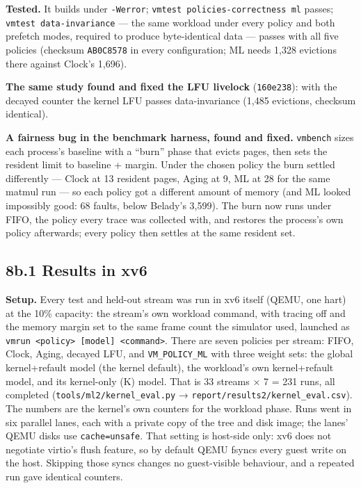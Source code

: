 \documentclass[10pt,a4paper]{article}
\newcommand{\code}[1]{\texttt{#1}}
\begin{document}
\textbf{Tested.} It builds under \code{-Werror}; \code{vmtest policies-correctness ml} passes; \code{vmtest data-invariance} — the same workload under every policy and both prefetch modes, required to produce byte-identical data — passes with all five policies (checksum \code{AB0C8578} in every configuration; ML needs 1,328 evictions there against Clock's 1,696).

\textbf{The same study found and fixed the LFU livelock} (\code{160e238}): with the decayed counter the kernel LFU passes data-invariance (1,485 evictions, checksum identical).

\textbf{A fairness bug in the benchmark harness, found and fixed.} \code{vmbench} sizes each process's baseline with a ``burn'' phase that evicts pages, then sets the resident limit to baseline + margin. Under the chosen policy the burn settled differently — Clock at 13 resident pages, Aging at 9, ML at 28 for the same matmul run — so each policy got a different amount of memory (and ML looked impossibly good: 68 faults, below Belady's 3,599). The burn now runs under FIFO, the policy every trace was collected with, and restores the process's own policy afterwards; every policy then settles at the same resident set.

\subsection*{8b.1 Results in xv6}

\textbf{Setup.} Every test and held-out stream was run in xv6 itself (QEMU, one hart) at the 10\% capacity: the stream's own workload command, with tracing off and the memory margin set to the same frame count the simulator used, launched as \code{vmrun <policy> [model] <command>}. There are seven policies per stream: FIFO, Clock, Aging, decayed LFU, and \code{VM\_\allowbreak{}POLICY\_\allowbreak{}ML} with three weight sets: the global kernel+refault model (the kernel default), the workload's own kernel+refault model, and its kernel-only (K) model. That is 33 streams × 7 = 231 runs, all completed (\code{tools/\allowbreak{}ml2/\allowbreak{}kernel\_\allowbreak{}eval.\allowbreak{}py} → \code{report/\allowbreak{}results2/\allowbreak{}kernel\_\allowbreak{}eval.\allowbreak{}csv}). The numbers are the kernel's own counters for the workload phase. Runs went in six parallel lanes, each with a private copy of the tree and disk image; the lanes' QEMU disks use \code{cache=unsafe}. That setting is host-side only: xv6 does not negotiate virtio's flush feature, so by default QEMU fsyncs every guest write on the host. Skipping those syncs changes no guest-visible behaviour, and a repeated run gave identical counters.
\end{document}
